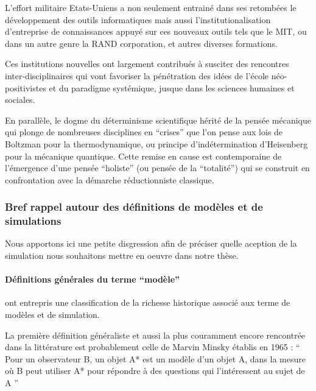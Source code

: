 L'effort militaire Etats-Uniens a non seulement entrainé dans ses retombées le développement des outils informatiques mais aussi l'institutionalisation d'entreprise de connaissances appuyé sur ces nouveaux outils tels que le MIT, ou dans un autre genre la RAND corporation, et autres diverses formations.

Ces institutions nouvelles ont largement contribués à susciter des rencontres inter-disciplinaires qui vont favoriser la pénétration des idées de l'école néo-positivistes et du paradigme systémique, jusque dans les sciences humaines et sociales.

En parallèle, le dogme du déterminisme scientifique hérité de la pensée mécanique qui plonge de nombreuses disciplines en \enquote{crises} \autocite[20-23]{Pouvreau2013} que l'on pense aux lois de Boltzman pour la thermodynamique, ou principe d’indétermination d'Heisenberg pour la mécanique quantique. Cette remise en cause est contemporaine de l'émergence d'une pensée \enquote{holiste} (ou pensée de la \enquote{totalité}) qui se construit en confrontation avec la démarche réductionniste classique.


\subsubsection{Bref rappel autour des définitions de modèles et de simulations}
\label{ssec:rapell_termes_generiques}

Nous apportons ici une petite disgression afin de préciser quelle aception de la simulation nous souhaitons mettre en oeuvre dans notre thèse.

\paragraph{Définitions générales du terme \enquote{modèle}}

\textcite{Varenne2013} ont entrepris une classification de la richesse historique associé aux terme de modèles et de simulation.

La première définition généraliste et aussi la plus couramment encore rencontrée dans la littérature est probablement celle de Marvin Minsky établis en 1965 \autocite{Varenne2008} \autocite[15]{Varenne2013}  : \enquote{ Pour un observateur B, un objet A* est un modèle d’un objet A, dans la mesure où B peut utiliser A* pour répondre à des questions qui l’intéressent au sujet de A } \autocite{Minsky1965}

